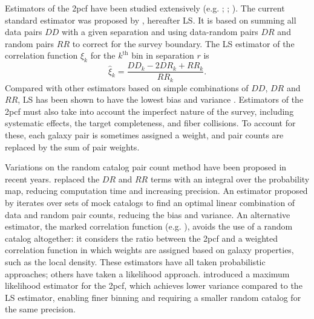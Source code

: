 \documentclass[modern]{aastex62}
\newcommand{\cf}{2pcf\xspace} %
\newcommand{\LS}{LS\xspace}
\begin{document}
Estimators of the \cf have been studied extensively (e.g. \citealt{PeeblesHauser1974}; \citealt{DavisPeebles1983}; \citealt{Hamilton1993}).
The current standard estimator was proposed by \cite{LandySzalay1993}, hereafter \LS. It is based on summing all data pairs $DD$ with a given separation and using data-random pairs $DR$ and random pairs $RR$ to correct for the survey boundary. The \LS estimator of the correlation function $\hat{\xi}_k$ for the $k^\mathrm{th}$ bin in separation $r$ is
\begin{equation} \label{eq:lsintro}
\hat{\xi}_k = \frac{DD_k - 2DR_k + RR_k}{RR_k}.
\end{equation}
Compared with other estimators based on simple combinations of $DD$, $DR$ and $RR$, \LS has been shown to have the lowest bias and variance \citep{Kerscher2000}.
Estimators of the \cf must also take into account the imperfect nature of the survey, including systematic effects, the target completeness, and fiber collisions.
To account for these, each galaxy pair is sometimes assigned a weight, and pair counts are replaced by the sum of pair weights.

Variations on the random catalog pair count method have been proposed in recent years.
\cite{Demina2016} replaced the $DR$ and $RR$ terms with an integral over the probability map, reducing computation time and increasing precision.
An estimator proposed by \cite{VargasMagana2013} iterates over sets of mock catalogs to find an optimal linear combination of data and random pair counts, reducing the bias and variance.
An alternative estimator, the marked correlation function (e.g. \citealt{WhitePadmanabhan2009}), avoids the use of a random catalog altogether: it considers the ratio between the \cf and a weighted correlation function in which weights are assigned based on galaxy properties, such as the local density.
These estimators have all taken probabilistic approaches; others have taken a likelihood approach.
\cite{BaxterRozo2013} introduced a maximum likelihood estimator for the \cf, which achieves lower variance compared to the \LS estimator, enabling finer binning and requiring a smaller random catalog for the same precision.
\end{document}
